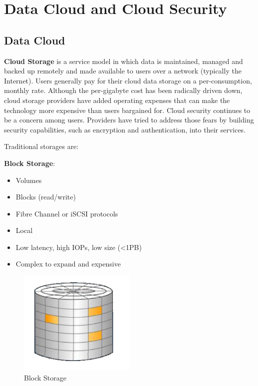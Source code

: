 
\chapter{Data Cloud and Cloud Security}

\section{Data Cloud}

\textbf{Cloud Storage} is a service model in which data is maintained, managed and backed up remotely and made available to users over a network (typically the Internet). Users generally pay for their cloud data storage on a per-consumption, monthly rate. Although the per-gigabyte cost has been radically driven down, cloud storage providers have added operating expenses that can make the technology more expensive than users bargained for. Cloud security continues to be a concern among users. Providers have tried to address those fears by building security capabilities, such as encryption and authentication, into their services.

Traditional storages are:

\begin{minipage}{0.45\textwidth}
    \textbf{Block Storage}:
    \begin{itemize}
        \item Volumes
        \item Blocks (read/write)
        \item Fibre Channel or iSCSI protocols
        \item Local
        \item Low latency, high IOPs, low size (<1PB)
        \item Complex to expand and expensive 
    \end{itemize}
\end{minipage}
\begin{minipage}{0.45\textwidth}
    \begin{figure}[H]
        \centering
        \includegraphics[width=0.5\textwidth]{assets/fig40.png}
        \caption{Block Storage}
    \end{figure}
\end{minipage}

